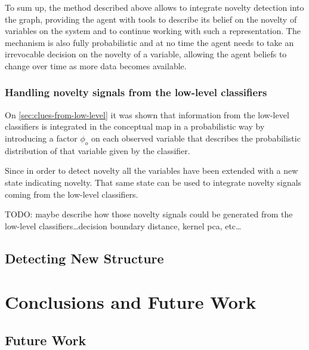 To sum up, the method described above allows to integrate novelty detection
into the graph, providing the agent with tools to describe its belief on the
novelty of variables on the system and to continue working with such a
representation. The mechanism is also fully probabilistic and at no time
the agent needs to take an irrevocable decision on the novelty of a variable,
allowing the agent beliefs to change over time as more data becomes available.


\subsection{Handling novelty signals from the low-level classifiers}
On \autoref{sec:clues-from-low-level} it was shown that information from the
low-level classifiers is integrated in the conceptual map in a probabilistic
way by introducing a factor $\phi_o$ on each observed variable that describes
the probabilistic distribution of that variable given by the classifier.

Since in order to detect novelty all the variables have been extended with a
new state indicating novelty. That same state can be used to integrate novelty
signals coming from the low-level classifiers.

TODO: maybe describe how those novelty signals could be generated from the
low-level classifiers\dots decision boundary distance, kernel pca, etc\dots


\section{Detecting New Structure}

\chapter{Conclusions and Future Work}\label{chap:conclusions}
\section{Future Work}

